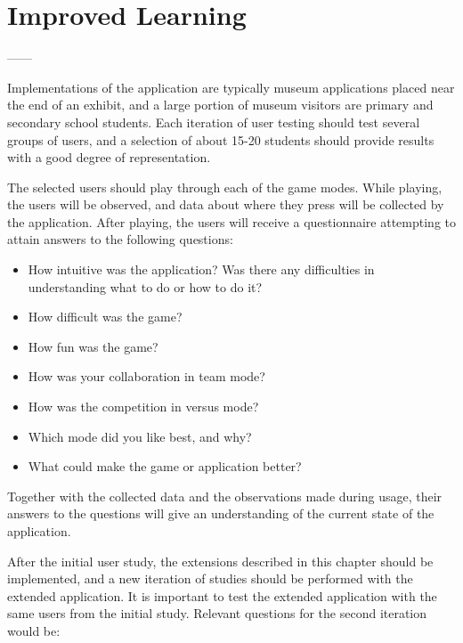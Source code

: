 
\section{Improved Learning}

------

Implementations of the application are typically museum applications placed near the end of an exhibit, and a large portion of museum visitors are primary and secondary school students. Each iteration of user testing should test several groups of users, and a selection of about 15-20 students should provide results with a good degree of representation.

The selected users should play through each of the game modes. While playing, the users will be observed, and data about where they press will be collected by the application. After playing, the users will receive a questionnaire attempting to attain answers to the following questions:

\begin{itemize}
	\item How intuitive was the application? Was there any difficulties in understanding what to do or how to do it?
	\item How difficult was the game?
	\item How fun was the game?
	\item How was your collaboration in team mode?
	\item How was the competition in versus mode?
	\item Which mode did you like best, and why?
	\item What could make the game or application better?
\end{itemize}

Together with the collected data and the observations made during usage, their answers to the questions will give an understanding of the current state of the application.

After the initial user study, the extensions described in this chapter should be implemented, and a new iteration of studies should be performed with the extended application. It is important to test the extended application with the same users from the initial study. Relevant questions for the second iteration would be:

